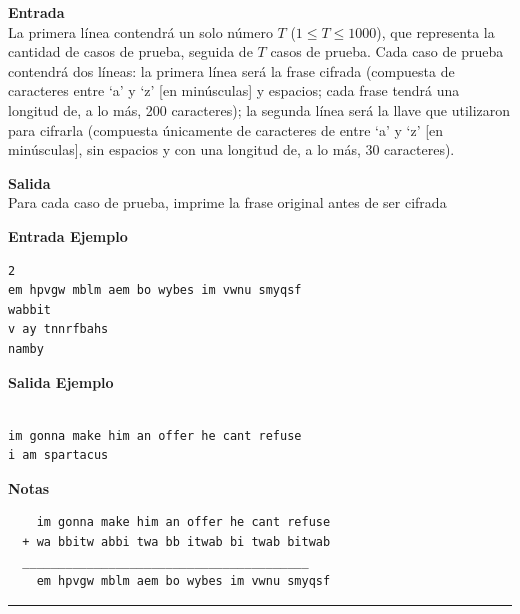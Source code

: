 \textbf{Entrada}\\
La primera línea contendrá un solo número $T$ ($1 \leq T \leq 1000$), que representa la cantidad de casos de prueba, seguida de $T$ casos de prueba.
Cada caso de prueba contendrá dos líneas: la primera línea será la frase cifrada (compuesta de caracteres entre `a' y `z' [en minúsculas] y espacios; cada frase tendrá una longitud de, a lo más, 200 caracteres); la segunda línea será la llave que utilizaron para cifrarla (compuesta únicamente de caracteres de entre `a' y `z' [en minúsculas], sin espacios y con una longitud de, a lo más, 30 caracteres).

\textbf{Salida}\\
Para cada caso de prueba, imprime la frase original antes de ser cifrada

\begin{multicols}{2}

\textbf{Entrada Ejemplo}
\begin{verbatim}
2
em hpvgw mblm aem bo wybes im vwnu smyqsf 
wabbit
v ay tnnrfbahs 
namby
\end{verbatim}

\columnbreak %

\textbf{Salida Ejemplo}
\begin{verbatim}

im gonna make him an offer he cant refuse 
i am spartacus
\end{verbatim}

\end{multicols}

\textbf{Notas}
\begin{verbatim}
    im gonna make him an offer he cant refuse 
  + wa bbitw abbi twa bb itwab bi twab bitwab
  ________________________________________
    em hpvgw mblm aem bo wybes im vwnu smyqsf 
\end{verbatim}
\noindent \rule[0.5ex]{1\columnwidth}{1pt}


